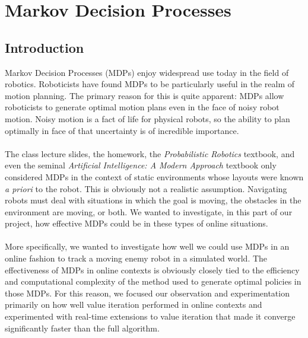 \documentclass{aiaa-tc}%
\begin{document}
\section{Markov Decision Processes}
\label{Markov Decision Processes}
\subsection{Introduction}
Markov Decision Processes (MDPs) enjoy widespread use today in the field of robotics. Roboticists have found MDPs to be particularly useful in the realm of motion planning. 
The primary reason for this is quite apparent: MDPs allow roboticists to generate optimal motion plans even in the face of noisy robot motion. Noisy motion is a fact of life for physical robots, so
the ability to plan optimally in face of that uncertainty is of incredible importance. \\ \\
The class lecture slides, the homework, the \emph{Probabilistic Robotics} textbook, and even the seminal \emph{Artificial Intelligence: A Modern Approach} textbook only considered MDPs in the context of static environments whose layouts were known \emph{a priori} to the
robot. This is obviously not a realistic assumption. Navigating robots must deal with situations in which the goal is moving, the obstacles in the environment are moving, or both. We wanted to investigate, in this part of our project, how effective MDPs could be in these types of online situations. \\ \\
More specifically, we wanted to investigate how well we could use MDPs in an online fashion to track a moving enemy robot in a simulated world. The effectiveness of MDPs in online contexts is obviously
closely tied to the efficiency and computational complexity of the method used to generate optimal policies in those MDPs. For this reason, we focused our observation and experimentation primarily on how well value iteration performed in online contexts and experimented with real-time extensions to value iteration that made it converge significantly faster than the full algorithm.
\end{document}

